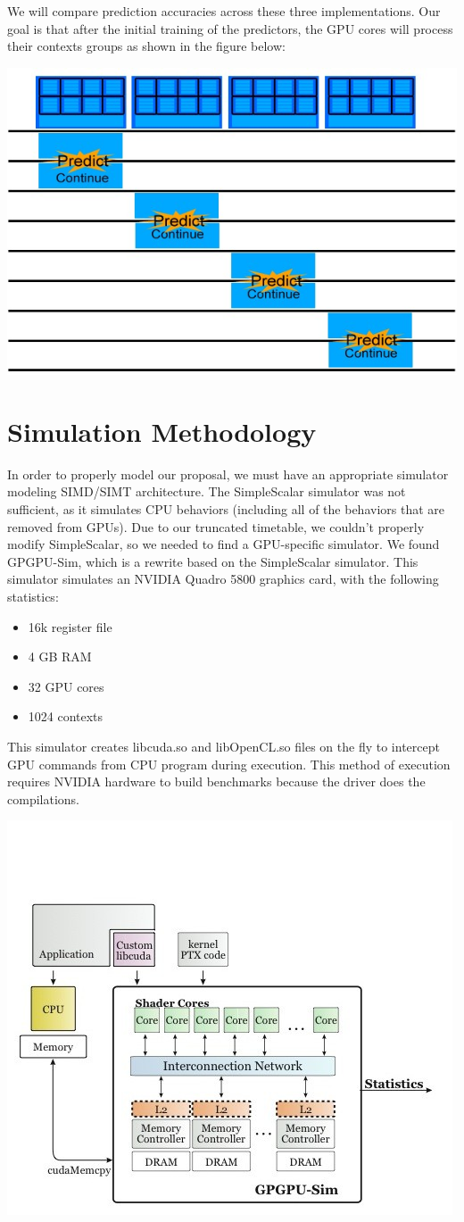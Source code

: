\documentclass[conference]{IEEEtran}
\begin{document}
We will compare prediction accuracies across these three implementations.  Our goal is that after the initial training of the predictors, the GPU cores will process their contexts groups as shown in the figure below:

\begin{center}
	\includegraphics[width=.45\textwidth]{GPU-predict-context.jpg}
\end{center}

\section{Simulation Methodology}

In order to properly model our proposal, we must have an appropriate simulator modeling SIMD/SIMT architecture.  The SimpleScalar simulator was not sufficient, as it simulates CPU behaviors (including all of the behaviors that are removed from GPUs).  Due to our truncated timetable, we couldn't properly modify SimpleScalar, so we needed to find a GPU-specific simulator.  We found GPGPU-Sim, which is a rewrite based on the SimpleScalar simulator.  This simulator simulates an NVIDIA Quadro 5800 graphics card, with the following statistics:

\begin{itemize}
	\item 16k register file
	\item 4 GB RAM
	\item 32 GPU cores
	\item 1024 contexts
\end{itemize}

This simulator creates libcuda.so and libOpenCL.so files on the fly to intercept GPU commands from CPU program during execution.  This method of execution requires NVIDIA hardware to build benchmarks because the driver does the compilations.

\begin{center}
	\includegraphics[width=.45\textwidth]{uarch1.jpg}
\end{center}
\end{document}
